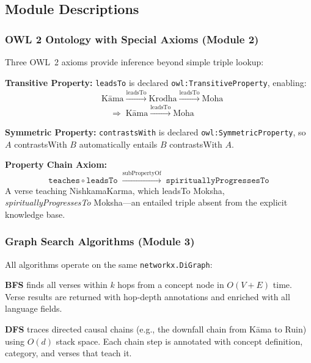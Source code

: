 \documentclass[conference]{IEEEtran}
\begin{document}
\subsection{Module Descriptions}

\subsubsection{OWL 2 Ontology with Special Axioms (Module 2)}

Three OWL~2 axioms provide inference beyond simple triple lookup:

\textbf{Transitive Property:} \texttt{leadsTo} is declared
\texttt{owl:TransitiveProperty}, enabling:
\begin{equation*}
  \begin{aligned}
    &\text{K\={a}ma} \xrightarrow{\text{leadsTo}} \text{Krodha}
    \xrightarrow{\text{leadsTo}} \text{Moha} \\
    &\quad\Rightarrow\; \text{K\={a}ma} \xrightarrow{\text{leadsTo}} \text{Moha}
  \end{aligned}
\end{equation*}

\textbf{Symmetric Property:} \texttt{contrastsWith} is declared
\texttt{owl:SymmetricProperty}, so $A$ contrastsWith $B$ automatically
entails $B$ contrastsWith $A$.

\textbf{Property Chain Axiom:}
\begin{equation}
  \texttt{teaches} \circ \texttt{leadsTo}
  \;\xrightarrow{\text{subPropertyOf}}\;
  \texttt{spirituallyProgressesTo}
  \label{eq:chain}
\end{equation}
A verse teaching NishkamaKarma, which leadsTo Moksha,
\textit{spirituallyProgressesTo} Moksha—an entailed triple absent from
the explicit knowledge base.

\subsubsection{Graph Search Algorithms (Module 3)}

All algorithms operate on the same \texttt{networkx.DiGraph}:

\textbf{BFS} finds all verses within $k$ hops from a concept node in
$O(V+E)$ time. Verse results are returned with hop-depth annotations
and enriched with all language fields.

\textbf{DFS} traces directed causal chains (e.g., the downfall chain
from K\={a}ma to Ruin) using $O(d)$ stack space. Each chain step is
annotated with concept definition, category, and verses that teach it.
\end{document}

